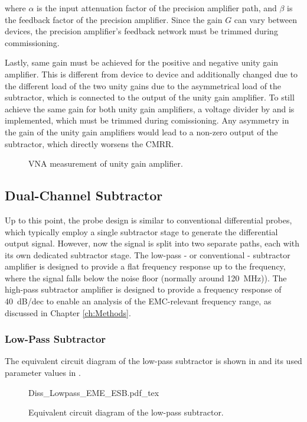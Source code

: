 where $\alpha$ is the input attenuation factor of the precision amplifier path, and $\beta$ is the feedback factor of the precision amplifier.
Since the gain $G$ can vary between devices, the precision amplifier's feedback network must be trimmed during commissioning.

Lastly, same gain must be achieved for the positive and negative unity gain amplifier.
This is different from device to device and additionally changed due to the different load of the two unity gains due to the asymmetrical load of the subtractor, which is connected to the output of the unity gain amplifier.
To still achieve the same gain for both unity gain amplifiers, a voltage divider by  and  is implemented, which must be trimmed during comissioning.
Any asymmetry in the gain of the unity gain amplifiers would lead to a non-zero output of the subtractor, which directly worsens the CMRR.


\begin{figure}[ht]
	\centering
	
	\caption{VNA measurement of unity gain amplifier.}\label{fig:VNA_rawUG}
\end{figure}

\subsection{Dual-Channel Subtractor}
Up to this point, the probe design is similar to conventional differential probes, which typically employ a single subtractor stage to generate the differential output signal.
However, now the signal is split into two separate paths, each with its own dedicated subtractor stage.
The low-pass - or conventional - subtractor amplifier is designed to provide a flat frequency response up to the frequency, where the signal falls below the noise floor (normally around \SI{120}{MHz})).
The high-pass subtractor amplifier is designed to provide a frequency response of \SI{+40}{dB/dec} to enable an analysis of the EMC-relevant frequency range, as discussed in Chapter \ref{ch:Methods}.

\subsubsection*{Low-Pass Subtractor}
The equivalent circuit diagram of the low-pass subtractor is shown in  and its used parameter values in .

\begin{figure}[ht]
	\centering
	{Diss_Lowpass_EME_ESB.pdf_tex}
	\caption{Equivalent circuit diagram of the low-pass subtractor.}\label{fig:EME_ESB_LP}
\end{figure}

